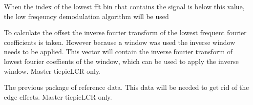 \documentclass[letterpaper,10pt,english]{sphinxmanual}
\begin{document}
\begin{fulllineitems}
\begin{fulllineitems}
\label{\detokenize{index:TiePieLCR.TiePieLCR.low_freq_hilbert}}
\end{fulllineitems}


\begin{fulllineitems}
\label{\detokenize{index:TiePieLCR.TiePieLCR.offset_bins}}
\sphinxAtStartPar
When the index of the lowest fft bin that contains the signal is below this value,  the low freqeuncy demodulation algorithm will be used

\end{fulllineitems}


\begin{fulllineitems}
\label{\detokenize{index:TiePieLCR.TiePieLCR.offset_win}}
\sphinxAtStartPar
To calculate the offset the inverse fourier transform of the lowest frequent fourier coefficients is taken. However because a window was used the inverse window needs to be applied. This vector will contain the inverse fourier transform of lowest fourier coeffients of the window, which can be used to apply the inverse window. Master tiepieLCR only.

\end{fulllineitems}


\begin{fulllineitems}
\label{\detokenize{index:TiePieLCR.TiePieLCR.old_reference_data}}
\sphinxAtStartPar
The previous package of reference data. This data will be needed to get rid of the edge effects. Master tiepieLCR only.


\end{fulllineitems}
\end{fulllineitems}
\end{document}
